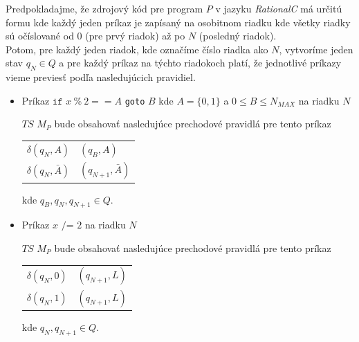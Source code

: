 \documentclass[11pt,a4paper]{article}
\begin{document}
Predpokladajme, že zdrojový kód pre program $P$ v jazyku \textit{RationalC} má určitú formu kde každý jeden príkaz je zapísaný na osobitnom riadku kde všetky riadky sú očíslované od $0$ (pre prvý riadok) až po $N$ (posledný riadok).\\

Potom, pre každý jeden riadok, kde označíme číslo riadka ako $N$, vytvoríme jeden stav $q_N \in Q$ a pre každý príkaz na týchto riadokoch platí, že jednotlivé príkazy vieme previesť podľa nasledujúcich pravidiel.
\begin{itemize}
    \item Príkaz $\texttt{if } x \ \% \ 2 == A$ \texttt{goto} $B$ kde $A = \{0, 1\}$ a $0 \leq B \leq N_{MAX}$ na riadku $N$\\[-1.5em]
        \begin{flushright}
        \begin{minipage}{0.90\textwidth}
            $TS$ $M_P$ bude obsahovať nasledujúce prechodové pravidlá pre tento príkaz
            \begin{center}
            \begin{tabular}{r@{ $=$ }l}
                $\delta(q_{N}, A)$       & $(q_{B}, A)$\\
                $\delta(q_{N}, \bar{A})$ & $(q_{N+1}, \bar{A})$
            \end{tabular}
            \end{center}
            kde $q_{B}, q_{N}, q_{N+1} \in Q$.
        \end{minipage}
        \end{flushright}
    \item Príkaz $x \texttt{ /= } 2$ na riadku $N$\\[-1.5em]
        \begin{flushright}
        \begin{minipage}{0.90\textwidth}
            $TS$ $M_P$ bude obsahovať nasledujúce prechodové pravidlá pre tento príkaz
            \begin{center}
            \begin{tabular}{r@{ $=$ }l}
                $\delta(q_{N}, 0)$ & $(q_{N+1}, L)$\\
                $\delta(q_{N}, 1)$ & $(q_{N+1}, L)$
            \end{tabular}
            \end{center}
            kde $q_{N}, q_{N+1} \in Q$.
        \end{minipage}
        \end{flushright}

\end{itemize}
\end{document}
